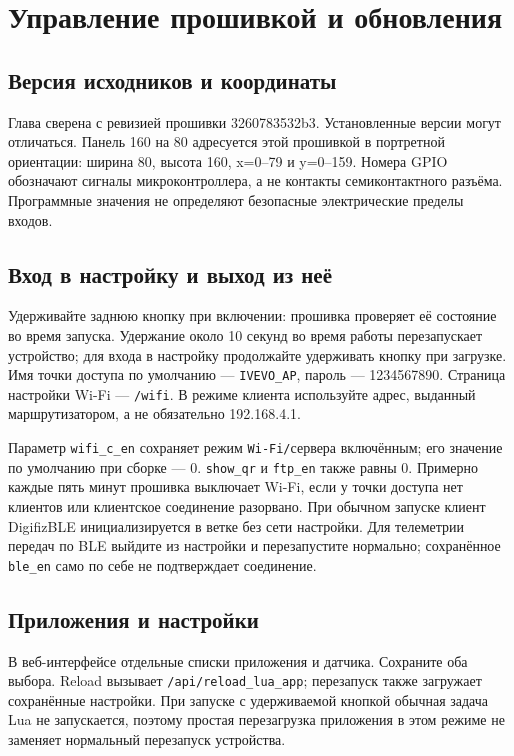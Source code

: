 \chapter{Управление прошивкой и обновления}\label{ch:firmware}
\section{Версия исходников и координаты}
Глава сверена с ревизией прошивки 3260783532b3. Установленные версии могут отличаться. Панель 160 на 80 адресуется этой прошивкой в портретной ориентации: ширина 80, высота 160, x=0–79 и y=0–159. Номера GPIO обозначают сигналы микроконтроллера, а не контакты семиконтактного разъёма. Программные значения не определяют безопасные электрические пределы входов.

\section{Вход в настройку и выход из неё}
Удерживайте заднюю кнопку при включении: прошивка проверяет её состояние во время запуска. Удержание около 10 секунд во время работы перезапускает устройство; для входа в настройку продолжайте удерживать кнопку при загрузке. Имя точки доступа по умолчанию — \nolinkurl{IVEVO_AP}, пароль — 1234567890. Страница настройки Wi-Fi — \nolinkurl{/wifi}. В режиме клиента используйте адрес, выданный маршрутизатором, а не обязательно 192.168.4.1.

Параметр \nolinkurl{wifi_c_en} сохраняет режим \nolinkurl{Wi-Fi/}сервера включённым; его значение по умолчанию при сборке — 0. \nolinkurl{show_qr} и \nolinkurl{ftp_en} также равны 0. Примерно каждые пять минут прошивка выключает Wi-Fi, если у точки доступа нет клиентов или клиентское соединение разорвано. При обычном запуске клиент DigifizBLE инициализируется в ветке без сети настройки. Для телеметрии передач по BLE выйдите из настройки и перезапустите нормально; сохранённое \nolinkurl{ble_en} само по себе не подтверждает соединение.

\section{Приложения и настройки}
В веб-интерфейсе отдельные списки приложения и датчика. Сохраните оба выбора. Reload вызывает \nolinkurl{/api/reload_lua_app}; перезапуск также загружает сохранённые настройки. При запуске с удерживаемой кнопкой обычная задача Lua не запускается, поэтому простая перезагрузка приложения в этом режиме не заменяет нормальный перезапуск устройства.


